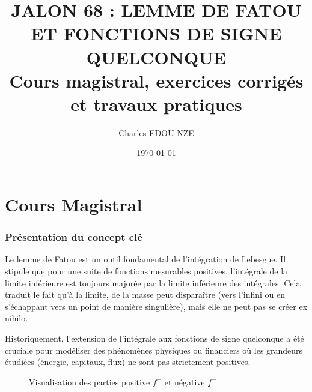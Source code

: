 \documentclass[11pt,a4paper]{article}
\title{\Huge JALON 68 : LEMME DE FATOU ET FONCTIONS DE SIGNE QUELCONQUE \\ \large Cours magistral, exercices corrigés et travaux pratiques}
\author{\Large Charles EDOU NZE}
\date{\today}
\begin{document}
\maketitle
\tableofcontents
\newpage

\part{Cours Magistral}
\section{Présentation du concept clé}

Le lemme de Fatou est un outil fondamental de l'intégration de Lebesgue. Il stipule que pour une suite de fonctions mesurables positives, l'intégrale de la limite inférieure est toujours majorée par la limite inférieure des intégrales. Cela traduit le fait qu'à la limite, de la masse peut disparaître (vers l'infini ou en s'échappant vers un point de manière singulière), mais elle ne peut pas se créer ex nihilo.

Historiquement, l'extension de l'intégrale aux fonctions de signe quelconque a été cruciale pour modéliser des phénomènes physiques ou financiers où les grandeurs étudiées (énergie, capitaux, flux) ne sont pas strictement positives.

\begin{figure}[h]
\centering
{}
\caption{Visualisation des parties positive $f^+$ et négative $f^-$.}
\end{figure}
\end{document}
